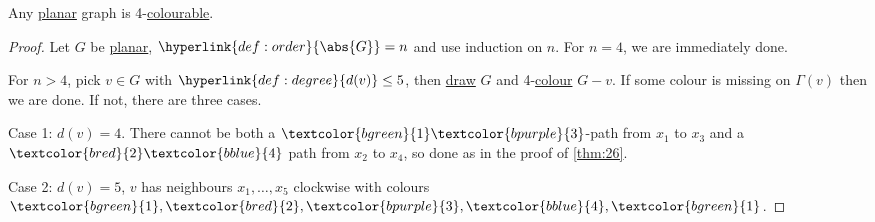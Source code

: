 \documentclass{article}
\newcommand{\red}[1]{\textcolor{bred}{#1}}
\newcommand{\green}[1]{\textcolor{bgreen}{#1}}
\newcommand{\blue}[1]{\textcolor{bblue}{#1}}
\newcommand{\purple}[1]{\textcolor{bpurple}{#1}}
\begin{document}
\begin{nthm}\label{thm:27}
    Any \hyperlink{def:drawing}{planar} graph is 4-\hyperlink{def:colour}{colourable}.
\end{nthm}

\begin{proof}
    Let $G$ be \hyperlink{def:drawing}{planar}, $\hyperlink{def:order}{\abs{G}} = n$ and use induction on $n$. For $n=4$, we are immediately done.

    For $n > 4$, pick $v \in G$ with $\hyperlink{def:degree}{d(v)} \leq 5$, then \hyperlink{def:drawing}{draw} $G$ and 4-\hyperlink{def:colour}{colour} $G-v$.
    If some colour is missing on $\Gamma(v)$ then we are done.
    If not, there are three cases.

    Case 1: $d(v) = 4$.
    There cannot be both a $\green{1}\purple{3}$-path from $x_1$ to $x_3$ and a $\red{2}\blue{4}$ path from $x_2$ to $x_4$, so done as in the proof of \cref{thm:26}.
    \begin{center}
    \end{center}

    Case 2: $d(v) = 5$, $v$ has neighbours $x_1, \dotsc, x_5$ clockwise with colours $\green{1},\red{2},\purple{3},\blue{4},\green{1}$.


\end{proof}
\end{document}
